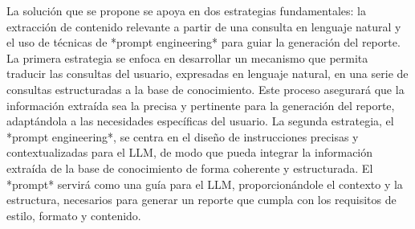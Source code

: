 La solución que se propone se apoya en dos estrategias fundamentales: la extracción de contenido relevante a partir de una consulta en lenguaje natural y el uso de técnicas de *prompt engineering* para guiar la generación del reporte. La primera estrategia se enfoca en desarrollar un mecanismo que permita traducir las consultas del usuario, expresadas en lenguaje natural, en una serie de consultas estructuradas a la base de conocimiento. Este proceso asegurará que la información extraída sea la precisa y pertinente para la generación del reporte, adaptándola a las necesidades específicas del usuario. La segunda estrategia, el *prompt engineering*, se centra en el diseño de instrucciones precisas y contextualizadas para el LLM, de modo que pueda integrar la información extraída de la base de conocimiento de forma coherente y estructurada. El *prompt* servirá como una guía para el LLM, proporcionándole el contexto y la estructura, necesarios para generar un reporte que cumpla con los requisitos de estilo, formato y contenido.

